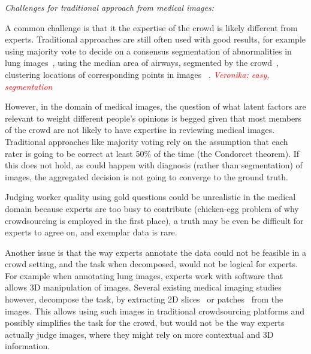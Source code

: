 \documentclass[10pt,twocolumn,letterpaper]{article}
\newcommand{\veronika}[1]{\emph{\textcolor{red}{Veronika: #1}}}
\begin{document}

\emph{Challenges for traditional approach from medical images:} 

A common challenge is that it the expertise of the crowd is likely different from experts. Traditional approaches are still often used with good results, for example using majority vote to decide on a consensus segmentation of abnormalities in lung images~\cite{oneil2017crowdsourcing}, using the median area of airways, segmented by the crowd~\cite{cheplygina2016early}, clustering locations of corresponding points in images ~\cite{maier2015crowdtruth}. \veronika{easy, segmentation}

 However, in the domain of medical images, the question of what latent factors are relevant to weight different people's opinions is begged given that most members of the crowd are not likely to have expertise in reviewing medical images. Traditional approaches like majority voting rely on the assumption that each rater is going to be correct at least 50\% of the time (the Condorcet theorem). If this does not hold, as could happen with diagnosis (rather than segmentation) of images, the aggregated decision is not going to converge to the ground truth.

  Judging worker quality using gold questions could be unrealistic in the medical domain because experts are too busy to contribute (chicken-egg problem of why crowdsourcing is employed in the first place), a truth may be even be difficult for experts to agree on, and exemplar data is rare.  
  
  Another issue is that the way experts annotate the data could not be feasible in a crowd setting, and the task when decomposed, would not be logical for experts. For example when annotating lung images, experts work with software that allows 3D manipulation of images. Several existing medical imaging studies however, decompose the task, by extracting 2D slices~\cite{oneil2017crowdsourcing,orting2017crowdsourced} or patches~\cite{cheplygina2016early} from the images. This allows using such images in traditional crowdsourcing platforms and possibly simplifies the task for the crowd, but would not be the way experts actually judge images, where they might rely on more contextual and 3D information. 
    

\end{document}
